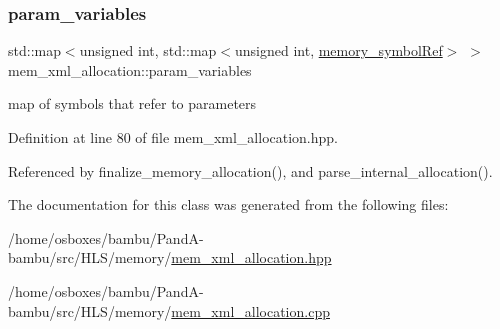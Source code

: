 \subsubsection{\texorpdfstring{param\+\_\+variables}{param\_variables}}
{\footnotesize\ttfamily std\+::map$<$unsigned int, std\+::map$<$unsigned int, \hyperlink{memory__symbol_8hpp_af3608dbc27177447c2d777fa712cc82a}{memory\+\_\+symbol\+Ref}$>$ $>$ mem\+\_\+xml\+\_\+allocation\+::param\+\_\+variables\hspace{0.3cm}{\ttfamily [private]}}



map of symbols that refer to parameters 



Definition at line 80 of file mem\+\_\+xml\+\_\+allocation.\+hpp.



Referenced by finalize\+\_\+memory\+\_\+allocation(), and parse\+\_\+internal\+\_\+allocation().



The documentation for this class was generated from the following files\+:\begin{DoxyCompactItemize}
\item 
/home/osboxes/bambu/\+Pand\+A-\/bambu/src/\+H\+L\+S/memory/\hyperlink{mem__xml__allocation_8hpp}{mem\+\_\+xml\+\_\+allocation.\+hpp}\item 
/home/osboxes/bambu/\+Pand\+A-\/bambu/src/\+H\+L\+S/memory/\hyperlink{mem__xml__allocation_8cpp}{mem\+\_\+xml\+\_\+allocation.\+cpp}\end{DoxyCompactItemize}
